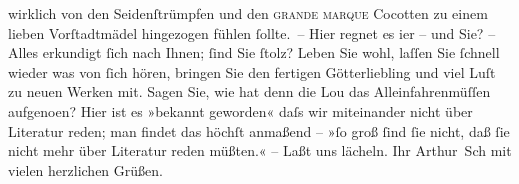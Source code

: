 \begin{ledgroupsized}[t]{13cm}
               wirklich von den Seidenſtrümpfen und den \textsc{grande marque}
               Cocotten zu einem lieben Vorſtadtmädel hingezogen fühlen ſollte. –\pend
           \pstart
           Hier regnet es i{\geminationm}er – und Sie? – Alles erkundigt ſich
               nach Ihnen; ſind Sie ſtolz? Leben Sie wohl, laſſen Sie ſchnell {\pb}wieder was von ſich hören, bringen Sie den fertigen
                  Götterliebling und viel
               Luſt zu neuen Werken mit. Sagen Sie, wie hat denn die Lou das Alleinfahrenmüſſen aufgeno{\geminationm}en? Hier ist es »bekannt geworden« daſs wir miteinander nicht über Literatur reden;
               man findet das höchſt anmaßend – »ſo groß ſind ſie nicht, daß ſie nicht mehr über
               Literatur reden müßten.« – Laßt uns lächeln.\pend
           \pstart Ihr \spacefill\mbox{Arthur Sch} mit vielen herzlichen Grüßen.\pend{}
         
         \endnumbering{}\end{ledgroupsized}  \newcommand{\dateiname}{L00483}\newcommand{\titel}{Arthur Schnitzler an Richard Beer-Hofmann, 15. 9. 1895}\newcommand{\editorInnen}{ Martin Anton Müller und Gerd-Hermann Susen}
      